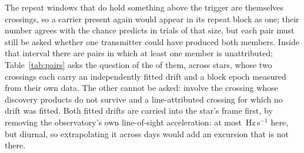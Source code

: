 The \WdNExc{} repeat windows that do hold something above the trigger are
themselves crossings, so a carrier present again would appear in its repeat
block as one; their number agrees with the \WdExpect{} chance predicts in
trials of that size, but each pair must still be asked whether one transmitter
could have produced both members. Inside that interval there are
\TjNCandPair{} pairs in which at least
one member is unattributed; Table~\ref{tab:pairs} asks the question of the
\TjNPair{} of them, across \TjNStarPair{} stars, whose two crossings each
carry an independently fitted drift and a block epoch measured from their own
data. The other \TjNCandLost{} cannot be asked: \TjNCandLostSpec{} involve the
crossing whose discovery products do not survive and \TjNCandLostFit{} a
line-attributed crossing for which no drift was fitted. Both fitted drifts are
carried into the star's frame first, by removing the observatory's own
line-of-sight acceleration: at most \TjFrameMaxHzS\,Hz\,s$^{-1}$ here, but
diurnal, so extrapolating it across days would add an excursion that is not
there.

